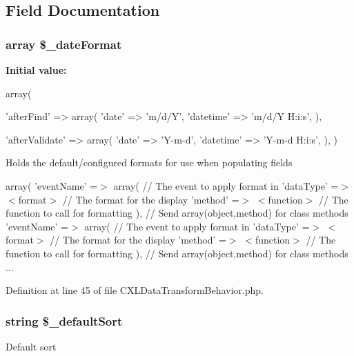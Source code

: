 \subsection{Field Documentation}
\hypertarget{classCXLDataTransformBehavior_ab9c3692fec45d84a91a926fdd974fe14}{
\subsubsection[{\$\_\-dateFormat}]{\setlength{\rightskip}{0pt plus 5cm}array \$\_\-dateFormat}}
\label{classCXLDataTransformBehavior_ab9c3692fec45d84a91a926fdd974fe14}
{\bfseries Initial value:}
\begin{DoxyCode}
 array(
    
    'afterFind' => array(
      'date' => 'm/d/Y',
      'datetime' => 'm/d/Y H:i:s',
    ),
    
    'afterValidate' => array(
      'date' => 'Y-m-d',
      'datetime' => 'Y-m-d H:i:s',
    ),
  )
\end{DoxyCode}
Holds the default/configured formats for use when populating fields

array( 'eventName' =$>$ array( // The event to apply format in 'dataType' =$>$ $<$format$>$ // The format for the display 'method' =$>$ $<$function$>$ // The function to call for formatting ), // Send array(object,method) for class methods 'eventName' =$>$ array( // The event to apply format in 'dataType' =$>$ $<$format$>$ // The format for the display 'method' =$>$ $<$function$>$ // The function to call for formatting ), // Send array(object,method) for class methods ... 

Definition at line 45 of file CXLDataTransformBehavior.php.

\hypertarget{classCXLDataTransformBehavior_ae5efd596975c96b8330c6b70cd116a79}{
\subsubsection[{\$\_\-defaultSort}]{\setlength{\rightskip}{0pt plus 5cm}string \$\_\-defaultSort}}
\label{classCXLDataTransformBehavior_ae5efd596975c96b8330c6b70cd116a79}
Default sort

